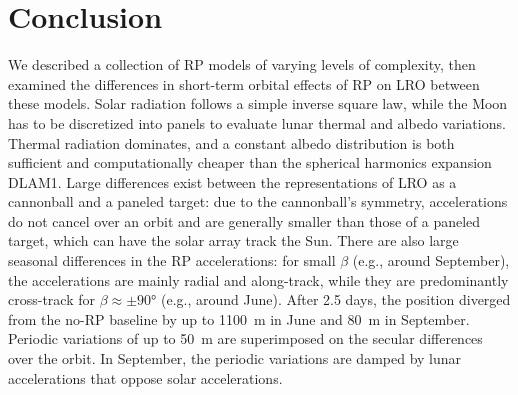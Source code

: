 \section{Conclusion}

We described a collection of \gls{RP} models of varying levels of complexity, then examined the differences in short-term orbital effects of \gls{RP} on \gls{LRO} between these models. Solar radiation follows a simple inverse square law, while the Moon has to be discretized into panels to evaluate lunar thermal and albedo variations. Thermal radiation dominates, and a constant albedo distribution is both sufficient and computationally cheaper than the spherical harmonics expansion \gls{DLAM1}. Large differences exist between the representations of \gls{LRO} as a cannonball and a paneled target: due to the cannonball's symmetry, accelerations do not cancel over an orbit and are generally smaller than those of a paneled target, which can have the solar array track the Sun. There are also large seasonal differences in the \gls{RP} accelerations: for small $\beta$ (e.g., around September), the accelerations are mainly radial and along-track, while they are predominantly cross-track for $\beta \approx \pm \ang{90}$ (e.g., around June). After 2.5 days, the position diverged from the no-\gls{RP} baseline by up to \qty{1100}{\m} in June and \qty{80}{\m} in September. Periodic variations of up to \qty{50}{\m} are superimposed on the secular differences over the orbit. In September, the periodic variations are damped by lunar accelerations that oppose solar accelerations.

